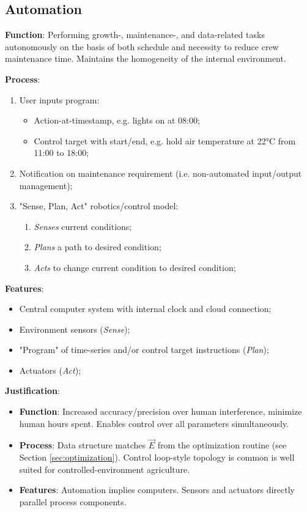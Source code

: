 \documentclass{report}
\begin{document}
\newpage

\subsection{Automation}
\label{sec:automation}


\textbf{Function}: Performing growth-, maintenance-, and data-related tasks autonomously on the basis of both schedule and necessity to reduce crew maintenance time. Maintains the homogeneity of the internal environment.

\textbf{Process}:
\begin{enumerate}
    \item User inputs program:
    \begin{itemize}
        \item Action-at-timestamp, e.g. lights on at 08:00;
        \item Control target with start/end, e.g. hold air temperature at 22°C from 11:00 to 18:00;
    \end{itemize}
    \item Notification on maintenance requirement (i.e. non-automated input/output management);
    \item "Sense, Plan, Act" robotics/control model:
    \begin{enumerate}
        \item \textit{Senses} current conditions;
        \item \textit{Plans} a path to desired condition;
        \item \textit{Acts} to change current condition to desired condition;
    \end{enumerate}
\end{enumerate}

\textbf{Features}:
\begin{itemize}
    \item Central computer system with internal clock and cloud connection;
    \item Environment sensors (\textit{Sense});
    \item "Program" of time-series and/or control target instructions (\textit{Plan});
    \item Actuators (\textit{Act});
\end{itemize}

\textbf{Justification}: 
\begin{itemize}
    \item \textbf{Function}: Increased accuracy/precision over human interference, minimize human hours spent. Enables control over all parameters simultaneously.
    \item \textbf{Process}: Data structure matches $\vec E$ from the optimization routine (see Section \ref{sec:optimization}). Control loop-style topology is common is well suited for controlled-environment agriculture.
    \item \textbf{Features}: Automation implies computers. Sensors and actuators directly parallel process components.
\end{itemize}
\end{document}
